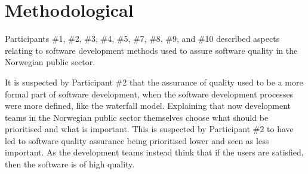

\section{Methodological} \label{sec:methodological}
Participants \#1, \#2, \#3, \#4, \#5, \#7, \#8, \#9, and \#10 described aspects relating to software development methods used to assure software quality in the Norwegian public sector.

It is suspected by Participant \#2 that the assurance of quality used to be a more formal part of software development, when the software development processes were more defined, like the waterfall model. Explaining that now development teams in the Norwegian public sector themselves choose what should be prioritised and what is important. This is suspected by Participant \#2 to have led to software quality assurance being prioritised lower and seen as less important. As the development teams instead think that if the users are satisfied, then the software is of high quality.



